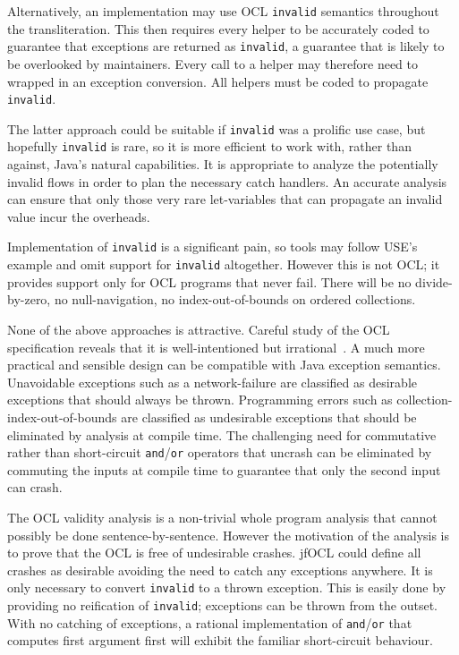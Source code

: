 \documentclass[sigconf]{acmart}
\begin{document}
Alternatively, an implementation may use OCL \texttt{invalid} semantics throughout the transliteration. This then requires every helper to be accurately coded to guarantee that exceptions are returned as \texttt{invalid}, a guarantee that is likely to be overlooked by maintainers. Every call to a helper may therefore need to wrapped in an exception conversion. All helpers must be coded to propagate \texttt{invalid}.

The latter approach could be suitable if \texttt{invalid} was a prolific use case, but hopefully \texttt{invalid} is rare, so it is more efficient to work with, rather than against, Java's natural capabilities. It is appropriate to analyze the potentially invalid flows in order to plan the necessary catch handlers. An accurate analysis can ensure that only those very rare let-variables that can propagate an invalid value incur the overheads.

Implementation of \texttt{invalid} is a significant pain, so tools may follow USE's\cite{USE} example and omit support for \texttt{invalid} altogether. However this is not OCL; it provides support only for OCL programs that never fail. There will be no divide-by-zero, no null-navigation, no index-out-of-bounds on ordered collections.

None of the above approaches is attractive. Careful study of the OCL specification reveals that it is well-intentioned but irrational~\cite{Willink2021}. A much more practical and sensible design can be compatible with Java exception semantics. Unavoidable exceptions such as a network-failure are classified as desirable exceptions that should always be thrown. Programming errors such as collection-index-out-of-bounds are classified as undesirable exceptions that should be eliminated by analysis at compile time. The challenging need for commutative rather than short-circuit \verb|and|/\verb|or| operators that uncrash can be eliminated by commuting the inputs at compile time to guarantee that only the second input can crash.

The OCL validity analysis \cite{Willink2021} is a non-trivial whole program analysis that cannot possibly be done sentence-by-sentence. However the motivation of the analysis is to prove that the OCL is free of undesirable crashes. jfOCL could define all crashes as desirable avoiding the need to catch any exceptions anywhere. It is only necessary to convert \texttt{invalid} to a thrown exception. This is easily done by providing no reification of \texttt{invalid}; exceptions can be thrown from the outset. With no catching of exceptions, a rational implementation of \verb|and|/\verb|or| that computes first argument first will exhibit the familiar short-circuit behaviour.
\end{document}
